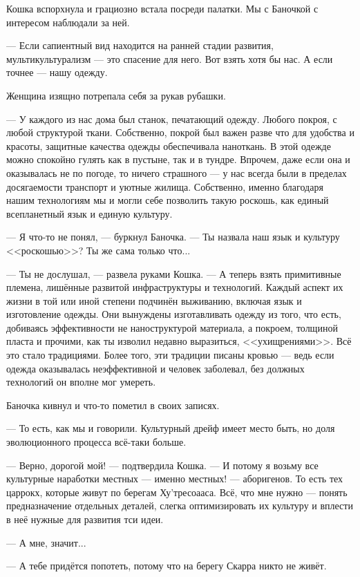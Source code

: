 Кошка вспорхнула и грациозно встала посреди палатки.
Мы с Баночкой с интересом наблюдали за ней.

--- Если сапиентный вид находится на ранней стадии развития, мультикультурализм --- это спасение для него.
Вот взять хотя бы нас.
А если точнее --- нашу одежду.

Женщина изящно потрепала себя за рукав рубашки.

--- У каждого из нас дома был станок, печатающий одежду.
Любого покроя, с любой структурой ткани.
Собственно, покрой был важен разве что для удобства и красоты, защитные качества одежды обеспечивала наноткань.
В этой одежде можно спокойно гулять как в пустыне, так и в тундре.
Впрочем, даже если она и оказывалась не по погоде, то ничего страшного --- у нас всегда были в пределах досягаемости транспорт и уютные жилища.
Собственно, именно благодаря нашим технологиям мы и могли себе позволить такую роскошь, как единый всепланетный язык и единую культуру.

--- Я что-то не понял, --- буркнул Баночка.
--- Ты назвала наш язык и культуру <<роскошью>>?
Ты же сама только что...

--- Ты не дослушал, --- развела руками Кошка.
--- А теперь взять примитивные племена, лишённые развитой инфраструктуры и технологий.
Каждый аспект их жизни в той или иной степени подчинён выживанию, включая язык и изготовление одежды.
Они вынуждены изготавливать одежду из того, что есть, добиваясь эффективности не наноструктурой материала, а покроем, толщиной пласта и прочими, как ты изволил недавно выразиться, <<ухищрениями>>.
Всё это стало традициями.
Более того, эти традиции писаны кровью --- ведь если одежда оказывалась неэффективной и человек заболевал, без должных технологий он вполне мог умереть.

Баночка кивнул и что-то пометил в своих записях.

--- То есть, как мы и говорили.
Культурный дрейф имеет место быть, но доля эволюционного процесса всё-таки больше.

--- Верно, дорогой мой! --- подтвердила Кошка.
--- И потому я возьму все культурные наработки местных --- именно местных! --- аборигенов.
То есть тех царрокх, которые живут по берегам Ху'тресоааса.
Всё, что мне нужно --- понять предназначение отдельных деталей, слегка оптимизировать их культуру и вплести в неё нужные для развития тси идеи.

--- А мне, значит...

--- А тебе придётся попотеть, потому что на берегу Скарра никто не живёт.

